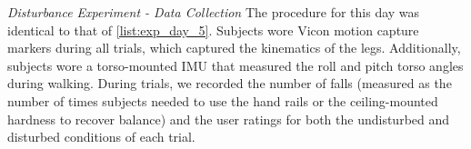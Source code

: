 \begin{days}
    \item\label{list:exp_day_6} \emph{Disturbance Experiment - Data Collection}
    The procedure for this day was identical to that of \cref{list:exp_day_5}.
    Subjects wore Vicon motion capture markers during all trials, which captured
    the kinematics of the legs. Additionally, subjects wore a torso-mounted IMU
    that measured the roll and pitch torso angles during walking. During trials,
    we recorded the number of falls (measured as the number of times subjects
    needed to use the hand rails or the ceiling-mounted hardness to recover
    balance) and the user ratings for both the undisturbed and disturbed
    conditions of each trial. 
    
\end{days}
